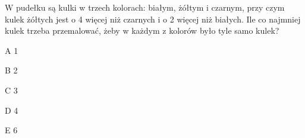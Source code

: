 \begin{tresc}
W pudełku są kulki w trzech kolorach: białym, żółtym i czarnym, przy czym kulek żółtych jest o 4 więcej niż czarnych i o 2 więcej niż białych. Ile co najmniej kulek trzeba przemalować, żeby w każdym z kolorów było tyle samo kulek?
\end{tresc}
\begin{wariant}{A} 1 \end{wariant}
\begin{wariant}{B} 2 \end{wariant}
\begin{wariant}{C} 3 \end{wariant}
\begin{wariant}{D} 4 \end{wariant}
\begin{wariant}{E} 6 \end{wariant}
